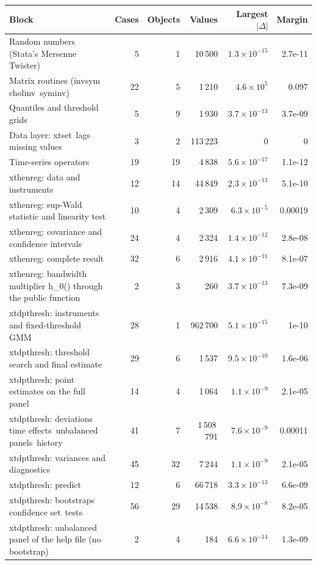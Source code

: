 \begin{longtable}{@{}p{7.4cm}rrrrr@{}}
\toprule
Block & Cases & Objects & Values & Largest $|\Delta|$ & Margin \\
\midrule
\endhead
Random numbers (Stata's Mersenne Twister) & 5 & 1 & 10\,500 & $1.3\times10^{-15}$ & 2.7e-11 \\
Matrix routines (invsym\, cholinv\, syminv) & 22 & 5 & 1\,210 & $4.6\times10^{5}$ & 0.097 \\
Quantiles and threshold grids & 5 & 9 & 1\,930 & $3.7\times10^{-13}$ & 3.7e-09 \\
Data layer: xtset\, lags\, missing values & 3 & 2 & 113\,223 & 0 & 0 \\
Time-series operators & 19 & 19 & 4\,838 & $5.6\times10^{-17}$ & 1.1e-12 \\
xthenreg: data and instruments & 12 & 14 & 44\,849 & $2.3\times10^{-13}$ & 5.1e-10 \\
xthenreg: sup-Wald statistic and linearity test & 10 & 4 & 2\,309 & $6.3\times10^{-5}$ & 0.00019 \\
xthenreg: covariance and confidence intervals & 24 & 4 & 2\,324 & $1.4\times10^{-12}$ & 2.8e-08 \\
xthenreg: complete result & 32 & 6 & 2\,916 & $4.1\times10^{-11}$ & 8.1e-07 \\
xthenreg: bandwidth multiplier h\_0() through the public function & 2 & 3 & 260 & $3.7\times10^{-13}$ & 7.3e-09 \\
xtdpthresh: instruments and fixed-threshold GMM & 28 & 1 & 962\,700 & $5.1\times10^{-15}$ & 1e-10 \\
xtdpthresh: threshold search and final estimate & 29 & 6 & 1\,537 & $9.5\times10^{-10}$ & 1.6e-06 \\
xtdpthresh: point estimates on the full panel & 14 & 4 & 1\,064 & $1.1\times10^{-9}$ & 2.1e-05 \\
xtdpthresh: deviations\, time effects\, unbalanced panels\, history & 41 & 7 & 1\,508\,791 & $7.6\times10^{-9}$ & 0.00011 \\
xtdpthresh: variances and diagnostics & 45 & 32 & 7\,244 & $1.1\times10^{-9}$ & 2.1e-05 \\
xtdpthresh: predict & 12 & 6 & 66\,718 & $3.3\times10^{-13}$ & 6.6e-09 \\
xtdpthresh: bootstraps\, confidence set\, tests & 56 & 29 & 14\,538 & $8.9\times10^{-8}$ & 8.2e-05 \\
xtdpthresh: unbalanced panel of the help file (no bootstrap) & 2 & 4 & 184 & $6.6\times10^{-14}$ & 1.3e-09 \\

\end{longtable}
